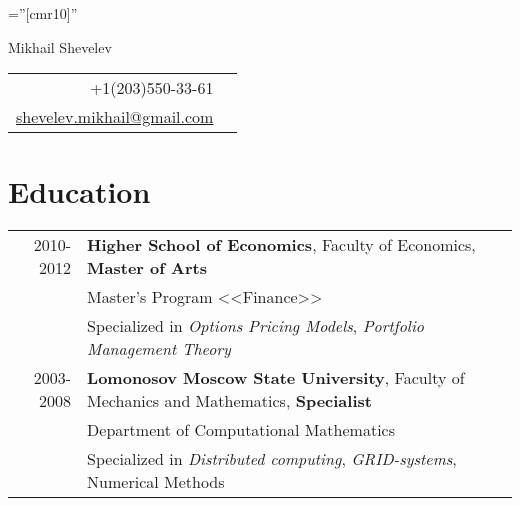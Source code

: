 \documentclass[unicode,a4paper,10pt]{article}
\begin{document}
\pagestyle{empty} %

\font\fb=''[cmr10]'' %

\par{
\begin{flushright}
{\Large Mikhail Shevelev}\\
\medskip	%
{\normalsize
\begin{tabular}{rr}
    +1(203)550-33-61\\
    \href{mailto:shevelev.mikhail@gmail.com}{shevelev.mikhail@gmail.com}
\end{tabular}
}
\end{flushright}
\par}



\section{Education}
\begin{tabular}{rl}
2010-2012& \textbf{Higher School of Economics}, Faculty of Economics, \textbf{Master of Arts}\\
& Master's Program <<Finance>>\\%
& Specialized in \textit{Options Pricing Models}, \textit{Portfolio Management Theory} \\
2003-2008& \textbf{Lomonosov Moscow State University}, Faculty of Mechanics and Mathematics, \textbf{Specialist}\\
& Department of Computational Mathematics \\
& Specialized in \textit{Distributed computing}, \textit{GRID-systems}, Numerical Methods \\
\end{tabular}
\end{document}
